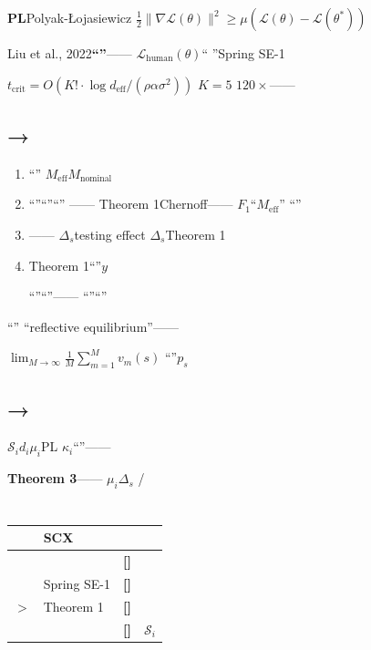 \documentclass[11pt,a4paper]{article}
\theoremstyle{remark}
\newcommand{\Sstates}{\mathcal{S}}
\newcommand{\heuristic}{\textnormal{\textbf{[]}}}
\newcommand{\metaphor}{\textnormal{\textbf{[]}}}
\begin{document}
\textbf{PL}Polyak-Łojasiewicz
$\frac{1}{2}\|\nabla\mathcal{L}(\theta)\|^2 \geq \mu(\mathcal{L}(\theta) - \mathcal{L}(\theta^*))$

Liu et al., 2022\textbf{``''}——
$\mathcal{L}_{\text{human}}(\theta)$``
''Spring SE-1
\textbf{}

$t_{\text{crit}} = O(K! \cdot \log d_{\text{eff}} / (\rho \alpha \sigma^2))$
$K=5$
$120 \times$——


\subsection{→}

\textbf{}

\begin{enumerate}[label=(\arabic*)]
    \item \textbf{}
          ``''
          $M_{\text{eff}}$$M_{\text{nominal}}$
    \item \textbf{}``''``''``''
          ——
          Theorem 1Chernoff\textbf{}——
          $F_1$``$M_{\text{eff}}$''
          ``''
    \item \textbf{}——
          $\Delta_s$testing effect
          \textbf{}$\Delta_s$Theorem 1
          
    \item \textbf{}Theorem 1``''$y$
          
          ``''``''——
          ``''``''
          \textbf{}
\end{enumerate}

\textbf{}``''
``\textbf{}reflective equilibrium''——

$\lim_{M \to \infty} \frac{1}{M}\sum_{m=1}^M v_m(s)$
``''$p_s$

\subsection{→}

\textbf{$\Sstates_i$}$d_i$$\mu_i$PL
$\kappa_i$``''——

\textbf{Theorem 3}——
$\mu_i$$\Delta_s$
/

\subsection{}

\begin{table}[htbp]
\centering
\caption{}
\label{tab:honesty}
\begin{tabular}{@{}llll@{}}
\toprule
\textbf{} & \textbf{SCX} & \textbf{} & \textbf{} \\
\midrule
 &  & \heuristic  &  \\
 & Spring SE-1 & \metaphor  &  \\
$>$ & Theorem 1 & \heuristic  &  \\
 &  & \heuristic  & $\Sstates_i$ \\
\bottomrule
\end{tabular}
\end{table}
\end{document}
